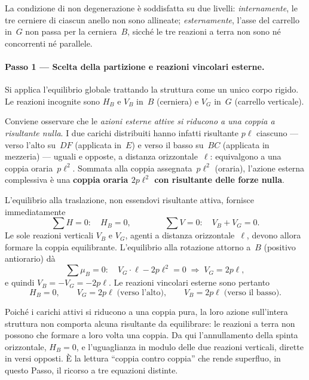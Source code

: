 La condizione di non degenerazione è soddisfatta su due
livelli: \emph{internamente}, le tre cerniere di ciascun
anello non sono allineate; \emph{esternamente}, l'asse del
carrello in~$G$ non passa per la cerniera~$B$, sicché le
tre reazioni a terra non sono né concorrenti né parallele.

\paragraph{Passo 1 --- Scelta della partizione e
	reazioni vincolari esterne.}

Si applica l'equilibrio globale trattando la struttura
come un unico corpo rigido. Le reazioni incognite sono
$H_B$ e $V_B$ in~$B$ (cerniera) e $V_G$ in~$G$ (carrello
verticale).

Conviene osservare che le \emph{azioni esterne attive si
	riducono a una coppia a risultante nulla}. I due carichi
distribuiti hanno infatti risultante $p\ell$ ciascuno ---
verso l'alto su~$DF$ (applicata in~$E$) e verso il basso
su~$BC$ (applicata in mezzeria) --- uguali e opposte, a
distanza orizzontale~$\ell$: equivalgono a una coppia
oraria~$p\ell^2$. Sommata alla coppia assegnata~$p\ell^2$
(oraria), l'azione esterna complessiva è una \textbf{coppia
	oraria $2p\ell^2$ con risultante delle forze nulla}.

L'equilibrio alla traslazione, non essendovi risultante
attiva, fornisce immediatamente
\[
\sum H = 0:\quad H_B = 0,
\qquad\qquad
\sum V = 0:\quad V_B + V_G = 0 .
\]
Le sole reazioni verticali $V_B$ e $V_G$, agenti a distanza
orizzontale~$\ell$, devono allora formare la coppia
equilibrante. L'equilibrio alla rotazione attorno a~$B$
(positivo antiorario) dà
\[
\sum \mu_B = 0:\quad
V_G\cdot\ell - 2p\ell^2 = 0
\;\Rightarrow\;
V_G = 2p\ell,
\]
e quindi $V_B = -V_G = -2p\ell$. Le reazioni vincolari
esterne sono pertanto
\[
H_B = 0,
\qquad
V_G = 2p\ell \;\text{(verso l'alto)},
\qquad
V_B = 2p\ell \;\text{(verso il basso)}.
\]

\begin{oss}
	Poiché i carichi attivi si riducono a una coppia pura,
	la loro azione sull'intera struttura non comporta alcuna
	risultante da equilibrare: le reazioni a terra non
	possono che formare a loro volta una coppia. Da qui
	l'annullamento della spinta orizzontale, $H_B = 0$,
	e l'uguaglianza in modulo delle due reazioni verticali,
	dirette in versi opposti. È la lettura ``coppia contro
	coppia'' che rende superfluo, in questo Passo, il
	ricorso a tre equazioni distinte.
\end{oss}

